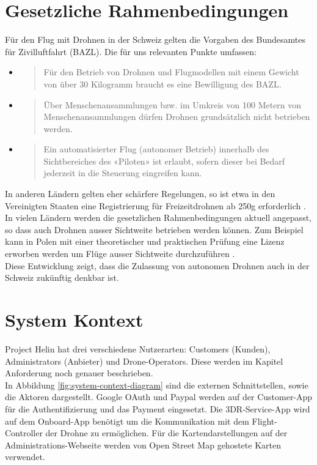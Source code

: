 \section{Gesetzliche Rahmenbedingungen}
Für den Flug mit Drohnen in der Schweiz gelten die Vorgaben des Bundesamtes für Zivilluftfahrt (BAZL). Die für uns relevanten Punkte umfassen:
\begin{itemize}
	\item{\blockquote{Für den Betrieb von Drohnen und Flugmodellen mit einem Gewicht von über 30 Kilogramm braucht es eine Bewilligung des BAZL.} \cite{drohne-bazl}}
	\item{\blockquote{Über Menschenansammlungen bzw. im Umkreis von 100 Metern von Menschenansammlungen dürfen Drohnen grundsätzlich nicht betrieben werden.} \cite{drohne-bazl}}
	\item{\blockquote{Ein automatisierter Flug (autonomer Betrieb) innerhalb des Sichtbereiches des «Piloten» ist erlaubt, sofern dieser bei Bedarf jederzeit in die Steuerung eingreifen kann.}
	\cite{drohne-bazl}}
\end{itemize}
In anderen Ländern gelten eher schärfere Regelungen, so ist etwa in den Vereinigten Staaten eine Registrierung für Freizeitdrohnen ab 250g erforderlich \cite[Seite 26]{pwc-drone}. In vielen Ländern werden die gesetzlichen Rahmenbedingungen aktuell angepasst, so dass auch Drohnen ausser Sichtweite betrieben werden können. Zum Beispiel kann in Polen mit einer theoretischer und praktischen Prüfung eine Lizenz erworben werden um Flüge ausser Sichtweite durchzuführen \cite[Seite 21]{pwc-drone}.\\

Diese Entwicklung zeigt, dass die Zulassung von autonomen Drohnen auch in der Schweiz zukünftig denkbar ist. 

\section{System Kontext}

Project Helin hat drei verschiedene Nutzerarten: Customers (Kunden), Administrators (Anbieter) und Drone-Operators. Diese werden im Kapitel Anforderung noch genauer beschrieben.\\

In Abbildung \ref{fig:system-context-diagram} sind die externen Schnittstellen, sowie die Aktoren dargestellt. Google OAuth und Paypal werden auf der Customer-App für die Authentifizierung und das Payment eingesetzt. Die 3DR-Service-App wird auf dem Onboard-App benötigt um die Kommunikation mit dem Flight-Controller der Drohne zu ermöglichen. Für die Kartendarstellungen auf der Administrations-Webseite werden von Open Street Map gehostete Karten verwendet.


